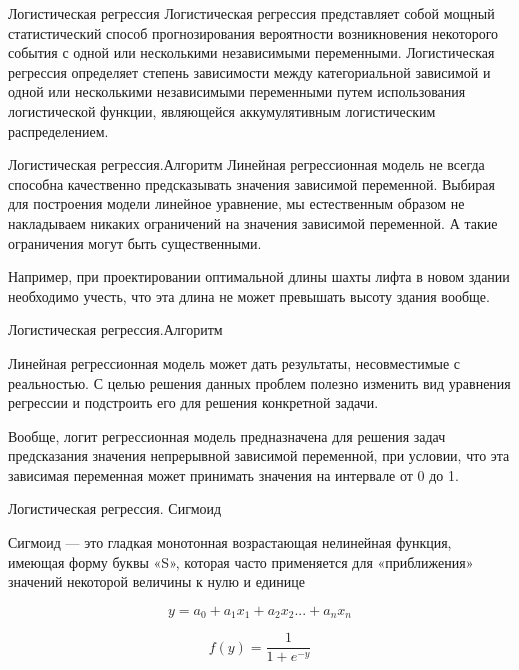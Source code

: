 \documentclass{beamer}
\begin{document}
\begin{frame}{Логистическая регрессия}
Логистическая регрессия представляет собой мощный статистический способ прогнозирования вероятности возникновения 
некоторого события с одной или несколькими независимыми переменными.
 Логистическая регрессия определяет степень зависимости между категориальной зависимой и одной или несколькими 
 независимыми переменными путем использования логистической функции, являющейся аккумулятивным логистическим распределением. 

\end{frame}




\begin{frame}{Логистическая регрессия.Алгоритм}
Линейная регрессионная модель не всегда способна качественно предсказывать значения зависимой переменной. Выбирая для построения модели линейное уравнение, мы естественным 
образом не накладываем никаких ограничений на значения зависимой переменной. А такие ограничения могут быть существенными.

Например, при проектировании оптимальной длины шахты лифта в новом здании необходимо учесть, что эта длина не может превышать высоту здания вообще.
\end{frame}


\begin{frame}{Логистическая регрессия.Алгоритм}

Линейная регрессионная модель может дать результаты, несовместимые с реальностью. С целью решения данных проблем полезно изменить 
вид уравнения регрессии и подстроить его для решения конкретной задачи.

Вообще, логит регрессионная модель предназначена для решения задач предсказания 
значения непрерывной зависимой переменной, при условии, что эта зависимая переменная 
может принимать значения на интервале от 0 до 1.
\end{frame}

\begin{frame}{Логистическая регрессия. Сигмоид}

Сигмоид — это гладкая монотонная возрастающая нелинейная функция,
 имеющая форму буквы «S», которая часто применяется для «приближения» 
 значений некоторой величины к нулю и единице


$$  y=a_0 + a_1x_1+ a_2x_2 ...+a_nx_n $$

$$ f(y) = \frac{1}{1 + e^{-y}}$$



\end{frame}
\end{document}
